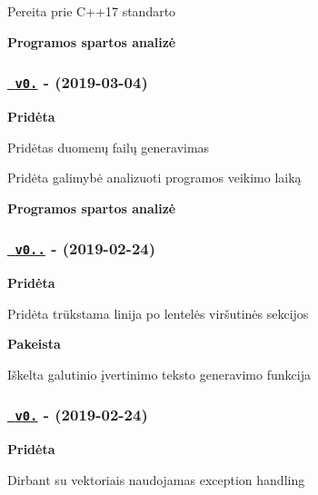 \begin{DoxyItemize}
\item Pereita prie C++17 standarto
\end{DoxyItemize}

{\bfseries{Programos spartos analizė}}



\subsubsection*{\href{https://github.com/emilisb/OOP-2/releases/tag/v0.4}{\texttt{ v0.}} -\/ (2019-\/03-\/04)}

{\bfseries{Pridėta}}


\begin{DoxyItemize}
\item Pridėtas duomenų failų generavimas
\item Pridėta galimybė analizuoti programos veikimo laiką
\end{DoxyItemize}

{\bfseries{Programos spartos analizė}}



\subsubsection*{\href{https://github.com/emilisb/OOP-2/releases/tag/v0.3.1}{\texttt{ v0..}} -\/ (2019-\/02-\/24)}

{\bfseries{Pridėta}}


\begin{DoxyItemize}
\item Pridėta trūkstama linija po lentelės viršutinės sekcijos
\end{DoxyItemize}

{\bfseries{Pakeista}}


\begin{DoxyItemize}
\item Iškelta galutinio įvertinimo teksto generavimo funkcija
\end{DoxyItemize}

\subsubsection*{\href{https://github.com/emilisb/OOP-2/releases/tag/v0.3}{\texttt{ v0.}} -\/ (2019-\/02-\/24)}

{\bfseries{Pridėta}}


\begin{DoxyItemize}
\item Dirbant su vektoriais naudojamas exception handling
\end{DoxyItemize}

